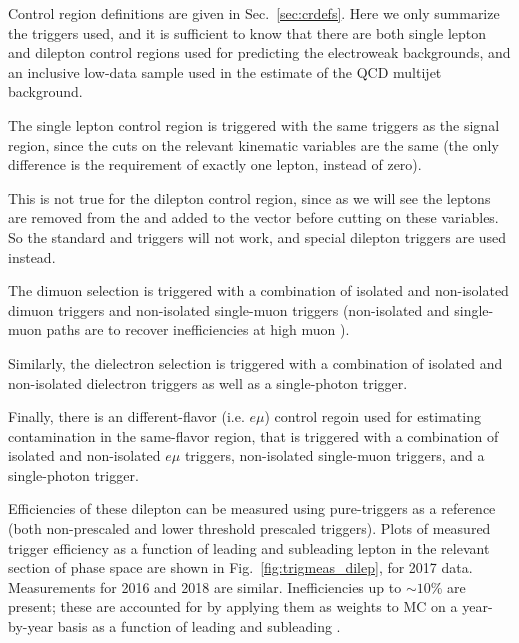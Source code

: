Control region definitions are given in Sec.~\ref{sec:crdefs}. Here we only summarize the triggers used,
and it is sufficient to know that there are both single lepton and dilepton control regions used for
predicting the electroweak backgrounds, and an inclusive low-\Ht data sample used in the estimate
of the QCD multijet background.

The single lepton control region is triggered with the same triggers as the signal region, since
the cuts on the relevant kinematic variables are the same (the only difference is the requirement of
exactly one lepton, instead of zero).

This is not true for the dilepton control region, since as we will see the leptons are removed from
the \Ht and added to the \vMet vector before cutting on these variables. So the standard \Ht and
\ptmiss triggers will not work, and special dilepton triggers are used instead.

The dimuon selection is triggered with a combination of isolated and non-isolated
dimuon triggers and non-isolated single-muon triggers (non-isolated and single-muon
paths are to recover inefficiencies at high muon \pt).

Similarly, the dielectron selection is triggered with a combination of isolated and non-isolated
dielectron triggers as well as a single-photon trigger.

Finally, there is an different-flavor (i.e. $e\mu$) control regoin used for estimating \ttbar contamination
in the same-flavor region, that is triggered with a combination of isolated and non-isolated
$e\mu$ triggers, non-isolated single-muon triggers, and a single-photon trigger.

Efficiencies of these dilepton can be measured using pure-\Ht triggers as a reference (both non-prescaled
and lower threshold prescaled triggers).
Plots of measured trigger efficiency as a function of leading and subleading lepton \pt in the relevant
section of phase space are shown in Fig.~\ref{fig:trigmeas_dilep}, for 2017 data. Measurements for 2016 
and 2018 are similar. Inefficiencies up to $\sim10$\% are present; these are accounted for by
applying them as weights to MC on a year-by-year basis as a function of leading and subleading \pt.

